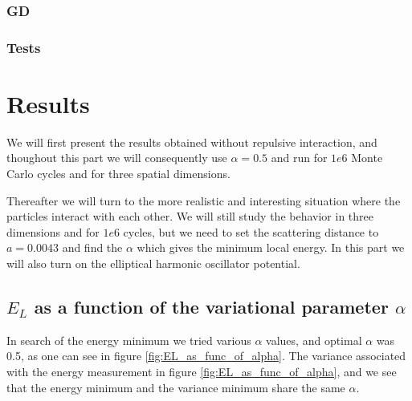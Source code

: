 \documentclass[norsk,a4paper,12pt]{article}
\begin{document}
\subsubsection{GD}

\subsubsection{Tests}



\section{Results} \label{Results}

We will first present the results obtained without repulsive interaction, and thoughout this part we will consequently use $\alpha=0.5$ and run for $1e6$ Monte Carlo cycles and for three spatial dimensions. 

Thereafter we will turn to the more realistic and interesting situation where the particles interact with each other. We will still study the behavior in three dimensions and for $1e6$ cycles, but we need to set the scattering distance to $a=0.0043$ and find the $\alpha$ which gives the minimum local energy. In this part we will also turn on the elliptical harmonic oscillator potential.

\subsection{$E_L$ as a function of the variational parameter $\alpha$}
In search of the energy minimum we tried various $\alpha$ values, and optimal $\alpha$ was 0.5, as one can see in figure \ref{fig:EL_as_func_of_alpha}. The variance associated with the energy measurement in figure \ref{fig:EL_as_func_of_alpha}, and we see that the energy minimum and the variance minimum share the same $\alpha$.
\end{document}
